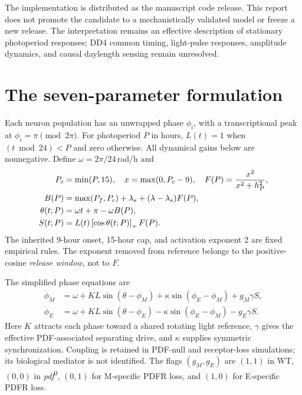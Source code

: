 \documentclass[11pt,letterpaper]{article}
\newcommand{\pdfzero}{\textit{pdf}\textsuperscript{0}}
\newcommand{\relu}[1]{\left[#1\right]_+}
\begin{document}
The implementation is distributed as the manuscript code release.
This report does not promote the candidate to a mechanistically validated
model or freeze a new release. The interpretation remains an effective
description of stationary photoperiod responses; DD4 common timing,
light-pulse responses, amplitude dynamics, and causal daylength sensing
remain unresolved.

\clearpage
\section{The seven-parameter formulation}
\label{sec:model}

Each neuron population has an unwrapped phase $\phi_i$, with a
transcriptional peak at $\phi_i=\pi\pmod{2\pi}$.
For photoperiod $P$ in hours, $L(t)=1$ when $(t\bmod24)<P$ and zero
otherwise. All dynamical gains below are nonnegative.
Define $\omega=2\pi/24$\,rad/h and
\begin{align}
P_c&=\min(P,15),\quad x=\max(0,P_c-9),\quad
F(P)=\frac{x^2}{x^2+h_P^2},\label{eq:F}\\
B(P)&=\max(P_f,P_c)+\lambda_s+(\lambda-\lambda_s)F(P),\label{eq:B}\\
\theta(t;P)&=\omega t+\pi-\omega B(P),\notag\\
S(t;P)&=L(t)\relu{\cos\theta(t;P)}F(P).\label{eq:S}
\end{align}
The inherited 9-hour onset, 15-hour cap, and activation exponent 2
are fixed empirical rules. The exponent removed from reference belongs
to the positive-cosine \emph{release window}, not to $F$.

The simplified phase equations are
\begin{equation}
\boxed{\begin{aligned}
\dot\phi_M&=\omega+KL\sin(\theta-\phi_M)
                  +\kappa\sin(\phi_E-\phi_M)+g_M\gamma S,\\
\dot\phi_E&=\omega+KL\sin(\theta-\phi_E)
                  -\kappa\sin(\phi_E-\phi_M)-g_E\gamma S.
\end{aligned}}\label{eq:phase}
\end{equation}
Here $K$ attracts each phase toward a shared rotating light reference,
$\gamma$ gives the effective PDF-associated separating drive, and
$\kappa$ supplies symmetric synchronization. Coupling is retained in
PDF-null and receptor-loss simulations; its biological mediator is
not identified. The flags $(g_M,g_E)$ are $(1,1)$ in WT, $(0,0)$ in
\pdfzero{}, $(0,1)$ for M-specific PDFR loss, and $(1,0)$ for
E-specific PDFR loss.
\end{document}
